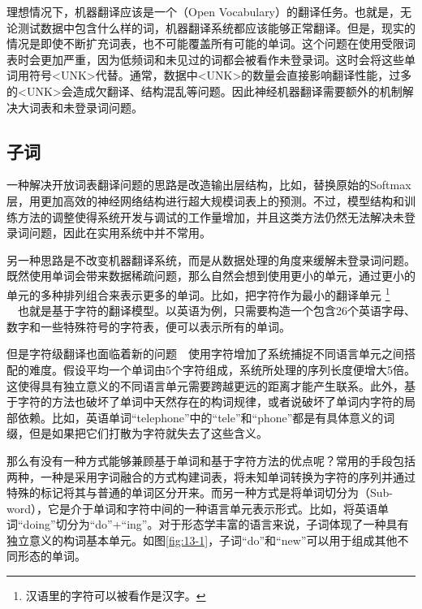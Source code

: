 \parinterval 理想情况下，机器翻译应该是一个{\small{}}（Open Vocabulary）的翻译任务。也就是，无论测试数据中包含什么样的词，机器翻译系统都应该能够正常翻译。但是，现实的情况是即使不断扩充词表，也不可能覆盖所有可能的单词。这个问题在使用受限词表时会更加严重，因为低频词和未见过的词都会被看作未登录词。这时会将这些单词用符号<UNK>代替。通常，数据中<UNK>的数量会直接影响翻译性能，过多的<UNK>会造成欠翻译、结构混乱等问题。因此神经机器翻译需要额外的机制解决大词表和未登录词问题。


\subsection{子词}

\parinterval 一种解决开放词表翻译问题的思路是改造输出层结构，比如，替换原始的Softmax层，用更加高效的神经网络结构进行超大规模词表上的预测。不过，模型结构和训练方法的调整使得系统开发与调试的工作量增加，并且这类方法仍然无法解决未登录词问题，因此在实用系统中并不常用。

\parinterval 另一种思路是不改变机器翻译系统，而是从数据处理的角度来缓解未登录词问题。既然使用单词会带来数据稀疏问题，那么自然会想到使用更小的单元，通过更小的单元的多种排列组合来表示更多的单词。比如，把字符作为最小的翻译单元 \footnote{汉语里的字符可以被看作是汉字。} \ \dash \ 也就是基于字符的翻译模型。以英语为例，只需要构造一个包含26个英语字母、数字和一些特殊符号的字符表，便可以表示所有的单词。

\parinterval 但是字符级翻译也面临着新的问题\ \dash\ 使用字符增加了系统捕捉不同语言单元之间搭配的难度。假设平均一个单词由5个字符组成，系统所处理的序列长度便增大5倍。这使得具有独立意义的不同语言单元需要跨越更远的距离才能产生联系。此外，基于字符的方法也破坏了单词中天然存在的构词规律，或者说破坏了单词内字符的局部依赖。比如，英语单词“telephone”中的“tele”和“phone”都是有具体意义的词缀，但是如果把它们打散为字符就失去了这些含义。

\parinterval 那么有没有一种方式能够兼顾基于单词和基于字符方法的优点呢？常用的手段包括两种，一种是采用字词融合的方式构建词表，将未知单词转换为字符的序列并通过特殊的标记将其与普通的单词区分开来。而另一种方式是将单词切分为{\small{}}（Sub-word），它是介于单词和字符中间的一种语言单元表示形式。比如，将英语单词“doing”切分为“do”+“ing”。对于形态学丰富的语言来说，子词体现了一种具有独立意义的构词基本单元。如图\ref{fig:13-1}，子词“do”和“new”可以用于组成其他不同形态的单词。

